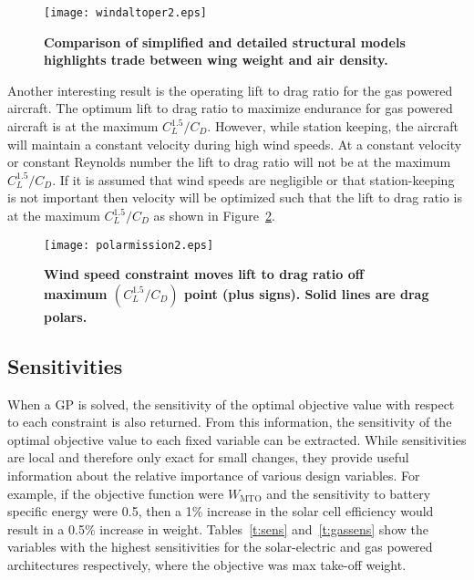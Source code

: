 \begin{figure}[H]
	\begin{center}
	\texttt{[image: windaltoper2.eps]}
 \caption{\textbf{Comparison of simplified and detailed structural models highlights trade between wing weight and air density.}}
 \label{f:altoper}
	\end{center}
\end{figure}

Another interesting result is the operating lift to drag ratio for the gas powered aircraft.  
The optimum lift to drag ratio to maximize endurance for gas powered aircraft is at the maximum $C_L^{1.5}/C_D$.\cite{br2}  
However, while station keeping, the aircraft will maintain a constant velocity during high wind speeds.  
At a constant velocity or constant Reynolds number the lift to drag ratio will not be at the maximum $C_L^{1.5}/C_D$.  
If it is assumed that wind speeds are negligible or that station-keeping is not important then velocity will be optimized such that the lift to drag ratio is at the maximum $C_L^{1.5}/C_D$ as shown in Figure~\ref{f:polarmission}.

\begin{figure}[H]
	\begin{center}
	\texttt{[image: polarmission2.eps]}
    \caption{\textbf{Wind speed constraint moves lift to drag ratio off maximum $(C_L^{1.5}/C_D)$ point (plus signs). Solid lines are drag polars.}}
 \label{f:polarmission}
	\end{center}
\end{figure}

\subsection{Sensitivities}

When a GP is solved, the sensitivity of the optimal objective value with respect to each constraint is also returned.  
From this information, the sensitivity of the optimal objective value to each fixed variable can be extracted.\cite{hoburgthesis} 
While sensitivities are local and therefore only exact for small changes, they provide useful information about the relative importance of various design variables. 
For example, if the objective function were $W_{\text{MTO}}$ and the sensitivity to battery specific energy were 0.5, then a 1\% increase in the solar cell efficiency would result in a 0.5\% increase in weight.  
Tables~\ref{t:sens} and~\ref{t:gassens} show the variables with the highest sensitivities for the solar-electric and gas powered architectures respectively, where the objective was max take-off weight.

